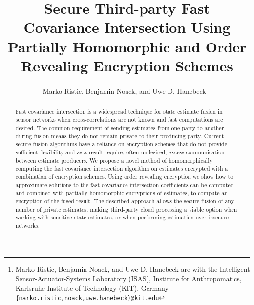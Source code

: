 \documentclass[letterpaper, 10 pt, conference]{ieeeconf}  %
\title{\LARGE \bf
Secure Third-party Fast Covariance Intersection Using Partially Homomorphic and Order Revealing Encryption Schemes
}
\author{Marko Ristic, Benjamin Noack, and Uwe D. Hanebeck%
\thanks{Marko Ristic, Benjamin Noack, and Uwe D. Hanebeck are with the Intelligent Sensor-Actuator-Systems Laboratory (ISAS), Institute for Anthropomatics, Karlsruhe Institute of Technology (KIT), Germany.\newline
{\tt\small \{marko.ristic,noack,uwe.hanebeck\}@kit.edu}%
}%
}
\begin{document}
\maketitle
\thispagestyle{empty}
\pagestyle{empty}




\begin{abstract}

Fast covariance intersection is a widespread technique for state estimate fusion in sensor networks when cross-correlations are not known and fast computations are desired. The common requirement of sending estimates from one party to another during fusion means they do not remain private to their producing party. Current secure fusion algorithms have a reliance on encryption schemes that do not provide sufficient flexibility and as a result require, often undesired, excess communication between estimate producers. We propose a novel method of homomorphically computing the fast covariance intersection algorithm on estimates encrypted with a combination of encryption schemes. Using order revealing encryption we show how to approximate solutions to the fast covariance intersection coefficients can be computed and combined with partially homomorphic encryptions of estimates, to compute an encryption of the fused result. The described approach allows the secure fusion of any number of private estimates, making third-party cloud processing a viable option when working with sensitive state estimates, or when performing estimation over insecure networks.

\end{abstract}



\end{document}
